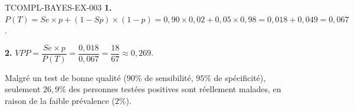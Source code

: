 \begin{corrige}{TCOMPL-BAYES-EX-003}
\textbf{1.} $P(T) = Se\times p + (1-Sp)\times(1-p) = 0{,}90\times0{,}02 + 0{,}05\times0{,}98 = 0{,}018+0{,}049 = 0{,}067$.

\textbf{2.} $VPP = \dfrac{Se\times p}{P(T)} = \dfrac{0{,}018}{0{,}067} = \dfrac{18}{67} \approx 0{,}269$.

Malgré un test de bonne qualité ($90\%$ de sensibilité, $95\%$ de spécificité), seulement $26{,}9\%$ des personnes testées positives sont réellement malades, en raison de la faible prévalence ($2\%$).
\end{corrige}
